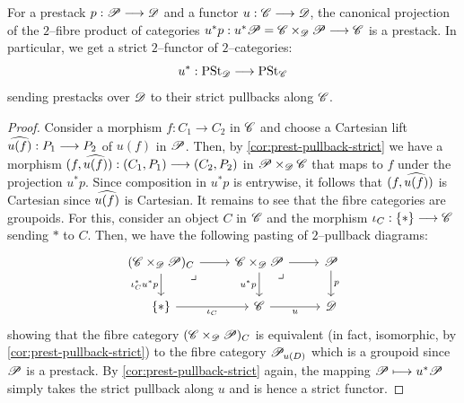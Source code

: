\documentclass[11pt]{amsart}
\begin{document}
\begin{prop}\label{prop:prest-pb}
For a prestack $p : \sP \to \sD$ and a functor $u : \sC \to \sD$, the canonical projection of the
$2$--fibre product of categories $u^*p : u^*\sP = \sC \times_\sD \sP \to \sC$ is a prestack.
In particular, we get a strict $2$--functor of $2$--categories:
\[
u^* : \PSt_{\sD} \to \PSt_{\sC}
\]
sending prestacks over $\mathscr{D}$ to their strict pullbacks along $\mathscr{C}$.
\end{prop}
\begin{proof}
Consider a morphism $f : C_1 \to C_2$ in $\mathscr{C}$ and choose a Cartesian lift
$\wh{u(f)} : P_1 \to P_2$ of $u(f)$ in $\mathscr{P}$.
Then, by \cref{cor:prest-pullback-strict} we have a morphism
$(f, \wh{u(f)}) : (C_1, P_1) \to (C_2, P_2)$ in $\mathscr{P} \times_\mathscr{D} \mathscr{C}$ that maps to
$f$ under the projection $u^*p$. Since composition in $u^*p$ is entrywise, it follows
that $(f, \widehat{u(f)})$ is Cartesian since $\widehat{u(f)}$ is Cartesian. It remains to see that
the fibre categories are groupoids. For this, consider an object $C$ in $\mathscr{C}$ and the morphism
$\iota_C : \set{*} \to \sC$ sending $*$ to $C$. Then, we have the following pasting
of $2$--pullback diagrams:
\[\begin{tikzcd}
(\sC \times_\sD \sP)_C \ar[r] \ar[d, "\iota_C^*u^*p" left]
    \ar[rd, phantom, "\lrcorner" very near start] &
\sC \times_\sD \sP \ar[r] \ar[d, "u^*p" left] \ar[rd, phantom, "\lrcorner" very near start] &
\sP \ar[d, "p"] \\
\set{*} \ar[r, "\iota_C" below] &
\sC \ar[r, "u" below] & \sD
\end{tikzcd}\]
showing that the fibre category $(\mathscr{C} \times_\mathscr{D} \mathscr{P})_C$ is equivalent (in fact, isomorphic,
by \cref{cor:prest-pullback-strict}) to the fibre category $\mathscr{P}_{u(D)}$ which is a groupoid since
$\mathscr{P}$ is a prestack. By \cref{cor:prest-pullback-strict} again, the mapping $\sP \mapsto u^*\sP$
simply takes the strict pullback along $u$ and is hence a strict functor.
\end{proof}
\end{document}
